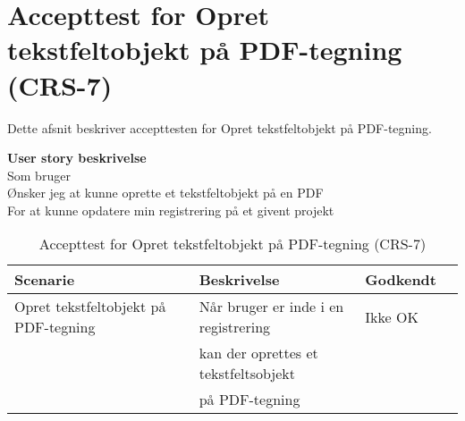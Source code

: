 \section{Accepttest for Opret tekstfeltobjekt på PDF-tegning (CRS-7)}
Dette afsnit beskriver accepttesten for Opret tekstfeltobjekt på PDF-tegning.

\textbf{User story beskrivelse} \\
Som bruger \\
Ønsker jeg at kunne oprette et tekstfeltobjekt på en PDF \\
For at kunne opdatere min registrering på et givent projekt

\begin{table}[H]
	\centering
	\begin{tabular}{|ll|l|ll|} \hline
		\textbf{Scenarie} &  & \textbf{Beskrivelse}&  \textbf{Godkendt}&  \\ \hline
		Opret tekstfeltobjekt på PDF-tegning&  &  Når bruger er inde i en registrering &  Ikke OK&  \\
		& & kan der oprettes et tekstfeltsobjekt& & \\ 
		& & på PDF-tegning& & \\ \hline
	\end{tabular}
	\caption{Accepttest for Opret tekstfeltobjekt på PDF-tegning (CRS-7)}
	\label{AcceptTekstfelt}
\end{table}